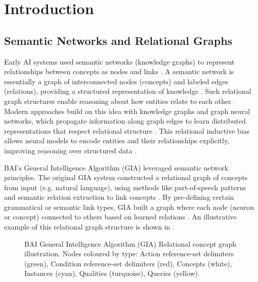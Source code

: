 \section{Introduction}\label{sec:litreview}

\subsection{Semantic Networks and Relational Graphs}

Early AI systems used semantic networks (knowledge graphs) to represent relationships between concepts as nodes and links \citep{sowa_semnet}.
A semantic network is essentially a graph of interconnected nodes (concepts) and labeled edges (relations), providing a structured representation of knowledge \citep{sowa_semnet}.
Such relational graph structures enable reasoning about how entities relate to each other.
Modern approaches build on this idea with knowledge graphs and graph neural networks, which propagate information along graph edges to learn distributed representations that respect relational structure \citep{battaglia2018relational}.
This relational inductive bias allows neural models to encode entities and their relationships explicitly, improving reasoning over structured data \citep{battaglia2018relational}.

BAI’s General Intelligence Algorithm (GIA) leveraged semantic network principles.
The original GIA system constructed a relational graph of concepts from input (e.g. natural language), using methods like part-of-speech patterns and semantic relation extraction to link concepts \citep{baxterai_gia,bairesearch2017GIA}.
By pre-defining certain grammatical or semantic link types, GIA built a graph where each node (neuron or concept) connected to others based on learned relations \citep{baxterai_gia}.
An illustrative example of this relational graph structure is shown in .

\begin{figure}[htbp]
\centering

\caption{BAI General Intelligence Algorithm (GIA) Relational concept graph illustration. Nodes coloured by type: Action reference-set delimiters (green), Condition reference-set delimiters (red), Concepts (white), Instances (cyan), Qualities (turquoise), Queries (yellow).}
\label{fig:intro-semantic-networks-relational-graph}
\end{figure}

